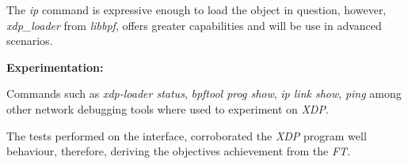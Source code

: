 The \textit{ip} command is expressive enough to load the object in question, however, \textit{xdp\_loader} from \textit{libbpf}, offers greater capabilities and will be use in advanced scenarios.

\noindent \textbf{Experimentation:}

Commands such as \textit{xdp-loader status}, \textit{bpftool prog show}, \textit{ip link show}, \textit{ping} among other network debugging tools where used to experiment on \textit{XDP}.

The tests performed on the interface, corroborated the \textit{XDP} program well behaviour, therefore, deriving the objectives achievement from the \textit{FT}.